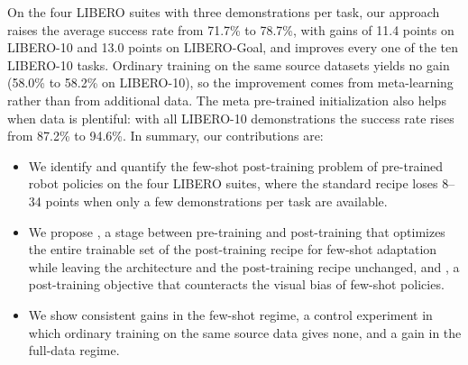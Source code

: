 On the four LIBERO suites with three demonstrations per task, our approach raises the average success rate from 71.7\% to 78.7\%, with gains of 11.4 points on LIBERO-10 and 13.0 points on LIBERO-Goal, and improves every one of the ten LIBERO-10 tasks.
Ordinary training on the same source datasets yields no gain (58.0\% to 58.2\% on LIBERO-10), so the improvement comes from meta-learning rather than from additional data.
The meta pre-trained initialization also helps when data is plentiful: with all LIBERO-10 demonstrations the success rate rises from 87.2\% to 94.6\%.
In summary, our contributions are:
\begin{itemize}
  \item We identify and quantify the few-shot post-training problem of pre-trained robot policies on the four LIBERO suites, where the standard recipe loses 8--34 points when only a few demonstrations per task are available.
  \item We propose \Method, a stage between pre-training and post-training that optimizes the entire trainable set of the post-training recipe for few-shot adaptation while leaving the architecture and the post-training recipe unchanged, and \Rpl, a post-training objective that counteracts the visual bias of few-shot policies.
  \item We show consistent gains in the few-shot regime, a control experiment in which ordinary training on the same source data gives none, and a gain in the full-data regime.
\end{itemize}
